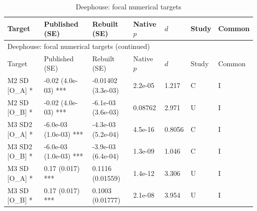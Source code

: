 {\scriptsize\setlength{\tabcolsep}{3pt}\renewcommand{\arraystretch}{1.06}
\begin{longtable}{@{}p{.245\linewidth}p{.17\linewidth}p{.17\linewidth}p{.085\linewidth}p{.060\linewidth}p{.08\linewidth}p{.07\linewidth}@{}}
\caption{Deephouse: focal numerical targets}\label{tab:focal:deephouse1999}\\
\toprule Target & Published (SE) & Rebuilt (SE) & Native $p$ & $d$ & Study & Common\\\midrule
\endfirsthead\multicolumn{7}{l}{\small Deephouse: focal numerical targets (continued)}\\\toprule Target & Published (SE) & Rebuilt (SE) & Native $p$ & $d$ & Study & Common\\\midrule\endhead\bottomrule\endfoot
M2 SD [O\_A] * & -0.02 (4.0e-03) *** & -0.01402 (3.3e-03) & 2.2e-05 & 1.217 & C & I\\
M2 SD [O\_B] * & -0.02 (4.0e-03) *** & -6.1e-03 (3.6e-03) & 0.08762 & 2.971 & U & I\\
M3 SD2 [O\_A] * & -6.0e-03 (1.0e-03) *** & -4.3e-03 (5.2e-04) & 4.5e-16 & 0.8056 & C & I\\
M3 SD2 [O\_B] * & -6.0e-03 (1.0e-03) *** & -3.9e-03 (6.4e-04) & 1.3e-09 & 1.046 & C & I\\
M3 SD [O\_A] * & 0.17 (0.017) *** & 0.1116 (0.01559) & 1.4e-12 & 3.306 & U & I\\
M3 SD [O\_B] * & 0.17 (0.017) *** & 0.1003 (0.01777) & 2.1e-08 & 3.954 & U & I\\
\end{longtable}}
